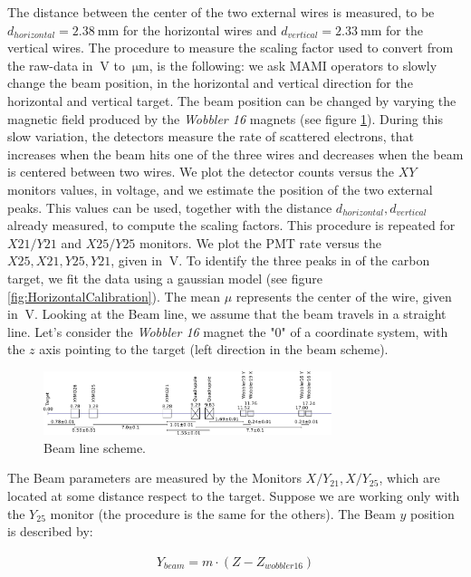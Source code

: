 The distance between the center of the two external wires is measured, to be $ d_{horizontal} = \SI{2.38}{\milli \meter}$ for the horizontal wires and $d_{vertical} = \SI{2.33}{\milli \meter}$ for the vertical wires. The procedure to measure the scaling factor used to convert from the raw-data in $\SI{}{\volt}$ to $\SI{}{\micro \meter}$, is the following: we ask MAMI operators to slowly change the beam position, in the horizontal and vertical direction for the horizontal and vertical target. The beam position can be changed by varying the magnetic field produced by the \textit{Wobbler 16} magnets (see figure \ref{fig:BeamLine}). 
During this slow variation, the detectors measure the rate of scattered electrons, that increases when the beam hits one of the three wires and decreases when the beam is centered between two wires. We plot the detector counts versus the $XY$ monitors values, in voltage, and we estimate the position of the two external peaks. This values can be used, together with the distance $d_{horizontal},d_{vertical}$ already measured, to compute the scaling factors. This procedure is repeated for $X21/Y21$ and $X25/Y25$ monitors. We plot the PMT rate versus the $X25,X21,Y25,Y21$, given in $\SI{}{\volt}$. 
To identify the three peaks in of the carbon target, we fit the data using a gaussian model (see figure \ref{fig:HorizontalCalibration}). The mean $\mu$ represents the center of the wire, given in $\SI{}{\volt}$.
Looking at the Beam line, we assume that the beam travels in a straight line. Let's consider the \textit{Wobbler 16} magnet the "$0$" of a coordinate system, with the $z$ axis pointing to the target (left direction in the beam scheme).
\begin{figure}[hbtp]
\centering
\includegraphics[width = 0.75\textwidth]{figures/XYMOCalibBeamLine.pdf}
\caption{Beam line scheme.}
\label{fig:BeamLine}
\end{figure} 

The Beam parameters are measured by the Monitors $X/Y_{21}, X/Y_{25}$, which are located at some distance respect to the target. Suppose we are working only with the $Y_{25}$ monitor (the procedure is the same for the others). The Beam $y$ position is described by:

\begin{align*}
Y_{beam} = m \cdot (Z - Z_{wobbler 16})
\end{align*}


